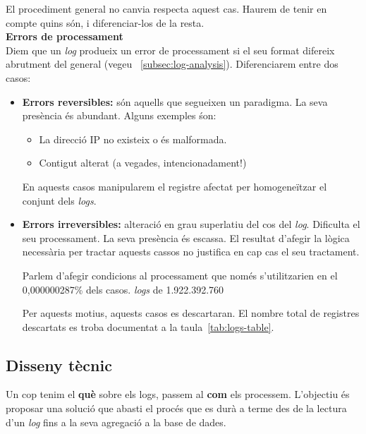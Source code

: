 \noindent
El procediment general no canvia respecta aquest cas.
Haurem de tenir en compte quins són, i diferenciar-los de la resta. \\

\noindent
\textbf{Errors de processament} \\

\noindent
Diem que un \textit{log} produeix un error de processament si el seu format difereix abrutment del general (vegeu ~\ref{subsec:log-analysis}).
Diferenciarem entre dos casos:

\begin{itemize}
    \item \textbf{Errors reversibles:} són aquells que segueixen un paradigma.
    La seva presència és abundant.
    Alguns exemples śon:
    \begin{itemize}
        \item La direcció \gls{IP} no existeix o és malformada.
        \item Contigut alterat (a vegades, intencionadament!)
    \end{itemize}
    En aquests casos manipularem el registre afectat per homogeneïtzar el conjunt dels \textit{logs}.
    \item \textbf{Errors irreversibles:} alteració en grau superlatiu del cos del \textit{log}.
    Dificulta el seu processament.
    La seva presència és escassa.
    El resultat d'afegir la lògica necessària per tractar aquests cassos no justifica en cap cas el seu tractament.

    \begin{tcolorbox}[colback=green!5!white, colframe=green!50!black, title=No val la pena]\label{tcbox:no-val-la-pena}
    Parlem d'afegir condicions al processament que només s'utilitzarien en el 0,000000287\% dels casos.
     \textit{logs} de 1.922.392.760
    \end{tcolorbox}

    Per aquests motius, aquests casos es descartaran.
    El nombre total de registres descartats es troba documentat a la taula~\ref{tab:logs-table}.
\end{itemize}

\clearpage

\subsection{Disseny tècnic}\label{subsec:logs-technical-design}

Un cop tenim el \textbf{què} sobre els logs, passem al \textbf{com} els processem.
L'objectiu és proposar una solució que abasti el procés que es durà a terme des de la lectura d’un \textit{log} fins a la seva agregació a la base de dades. \\

